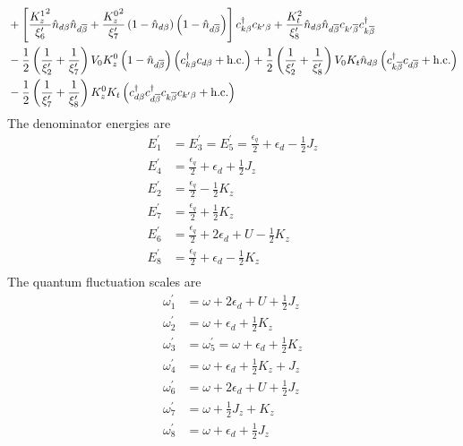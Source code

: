 \documentclass[12pt,twoside]{article}
\numberwithin{equation}{section}
\begin{document}
\begin{equation}
\begin{aligned}
&+\left[\frac{{K_z^1}^2}{\xi^\prime_6}\hat n_{d\beta}\hat n_{d\overline\beta} + \frac{{K_z^0}^2}{\xi^\prime_7}\left(1 - \hat n_{d\beta}\right)\left(1 - \hat n_{d\overline\beta}\right)\right]c^\dagger_{k\beta}c_{k^\prime\beta} + \frac{K_t^2}{\xi^\prime_8}\hat n_{d\beta}\hat n_{d\overline\beta}c_{k^\prime\overline\beta}c^\dagger_{k\overline\beta} \\
&- \frac{1}{2}\left(\frac{1}{\xi^\prime_2} + \frac{1}{\xi^\prime_7}\right)V_0 K_z^0\left(1 - \hat n_{d\overline\beta}\right)\left(c^\dagger_{k\beta}c_{d\beta} + \text{h.c.}\right) + \frac{1}{2}\left(\frac{1}{\xi^\prime_2} + \frac{1}{\xi^\prime_8}\right)V_0 K_t\hat n_{d\beta}\left(c^\dagger_{k\overline\beta}c_{d\overline\beta} + \text{h.c.}\right) \\
&- \frac{1}{2}\left(\frac{1}{\xi^\prime_7} + \frac{1}{\xi^\prime_8}\right)K_z^0 K_t\left(c^\dagger_{d\beta}c^\dagger_{d\overline\beta}c_{k\overline\beta}c_{k^\prime\beta} + \text{h.c.}\right) 
\end{aligned}\end{equation}
The denominator energies are
\begin{equation}\begin{aligned}
	E_1^\prime &= E_3^\prime = E_5^\prime = \frac{\epsilon_q}{2} + \epsilon_d - \frac{1}{2}J_z\\
	E_4^\prime &= \frac{\epsilon_q}{2} + \epsilon_d + \frac{1}{2}J_z\\
	E_2^\prime &= \frac{\epsilon_q}{2} - \frac{1}{2}K_z\\
	E_7^\prime &= \frac{\epsilon_q}{2} + \frac{1}{2}K_z\\
	E_6^\prime &= \frac{\epsilon_q}{2} + 2\epsilon_d + U - \frac{1}{2}K_z\\
	E_8^\prime &= \frac{\epsilon_q}{2} + \epsilon_d - \frac{1}{2}K_z\\
\end{aligned}\end{equation}
The quantum fluctuation scales are
\begin{equation}\begin{aligned}
	\omega_1^\prime&=\omega+2\epsilon_d+U+\frac{1}{2}J_z\\
	\omega_2^\prime&=\omega+\epsilon_d+\frac{1}{2}K_z \\
	\omega_3^\prime&=\omega_5^\prime=\omega+\epsilon_d + \frac{1}{2}K_z\\
	\omega_4^\prime&=\omega+\epsilon_d+\frac{1}{2}K_z + J_z \\
	\omega_6^\prime&=\omega+2\epsilon_d+U+\frac{1}{2}J_z\\
	\omega_7^\prime&=\omega+\frac{1}{2}J_z + K_z\\
	\omega_8^\prime &=\omega+\epsilon_d+\frac{1}{2}J_z \\
\end{aligned}\end{equation}
\end{document}
